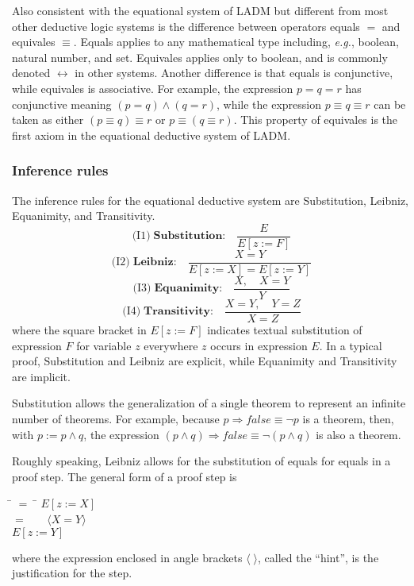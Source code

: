 \documentclass[12pt, fleqn, leqno]{article}
\newcommand{\lgap}{2pt}                             %
\newcommand{\mymathindent}{24pt}                    %
\newcommand{\impl}{\ensuremath{\Rightarrow}}        %
\newcommand{\Gll} {\langle}                         %
\newcommand{\Ggg} {\rangle}                         %
\newcommand{\Hint}[1]     {\ \ \ $\Gll              \mbox{#1} \Ggg$ }   %
\begin{document}
Also consistent with the equational system of LADM but different from most other deductive logic systems
is the difference between operators equals $=$ and equivales $\equiv$.
Equals applies to any mathematical type including, {\itshape e.g.\/}, boolean, natural number, and set.
Equivales applies only to boolean, and is commonly denoted $\leftrightarrow$ in other systems.
Another difference is that equals is conjunctive, while equivales is associative.
For example, the expression $p = q = r$ has conjunctive meaning $(p = q) \land (q = r)$, while the expression $p \equiv q \equiv r$
can be taken as either $(p \equiv q) \equiv r$ or $p \equiv (q \equiv r)$.
This property of equivales is the first axiom in the equational deductive system of LADM.

\subsubsection{Inference rules}

The inference rules for the equational deductive system are Substitution, Leibniz, Equanimity, and Transitivity.
\[
\textrm{(I1)}\; \textbf{Substitution:}\quad \frac{E}{E[z:=F]}
\]
\[
\textrm{(I2)}\; \textbf{Leibniz:}\quad \frac{X=Y}{E[z:=X]=E[z:=Y]}
\]
\[
\textrm{(I3)}\; \textbf{Equanimity:}\quad \frac{X, \quad X=Y}{Y}
\]
\[
\textrm{(I4)}\; \textbf{Transitivity:}\quad \frac{X=Y, \quad Y=Z}{X=Z}
\]
where the square bracket in $E[z:=F]$ indicates textual substitution of expression $F$ for variable $z$
everywhere $z$ occurs in expression $E$.
In a typical proof, Substitution and Leibniz are explicit, while Equanimity and Transitivity are implicit.

Substitution allows the generalization of a single theorem to represent an infinite number of theorems.
For example, because $p\impl \mathit{false} \equiv \lnot p$ is a theorem, then, with $p:=p\land q$, the expression
$(p\land q)\impl \mathit{false} \equiv \lnot (p\land q)$ is also a theorem.

Roughly speaking, Leibniz allows for the substitution of equals for equals in a proof step.
The general form of a proof step is
\begin{tabbing}
\hspace{\mymathindent} \= $= \;$ \=  \kill
  \> \>   $E[z:=X]$\\[\lgap]
  \> $=$  \>  \Hint{$X=Y$} \\[\lgap]
  \> \>   $E[z:=Y]$
\end{tabbing}
where the expression enclosed in angle brackets $\Gll\;\Ggg$, called the ``hint'', is the justification for the step.
\end{document}
